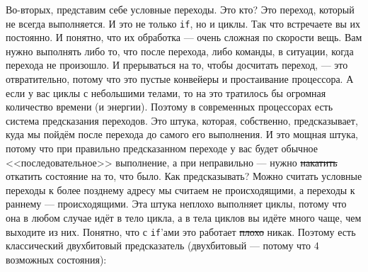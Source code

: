 \documentclass{article}
\begin{document}
    Во-вторых, представим себе условные переходы. Это кто? Это переход, который не всегда выполняется. И это не только \texttt{if}, но и циклы. Так что встречаете вы их постоянно. И понятно, что их обработка --- очень сложная по скорости вещь. Вам нужно выполнять либо то, что после перехода, либо команды, в ситуации, когда перехода не произошло. И прерываться на то, чтобы досчитать переход, --- это отвратительно, потому что это пустые конвейеры и простаивание процессора. А если у вас циклы с небольшими телами, то на это тратилось бы огромная количество времени (и энергии). Поэтому в современных процессорах есть система предсказания переходов. Это штука, которая, собственно, предсказывает, куда мы пойдём после перехода до самого его выполнения. И это мощная штука, потому что при правильно предсказанном переходе у вас будет обычное <<последовательное>> выполнение, а при неправильно --- нужно \sout{накатить} откатить состояние на то, что было. Как предсказывать? Можно считать условные переходы к более позднему адресу мы считаем не происходящими, а переходы к раннему --- происходящими. Эта штука неплохо выполняет циклы, потому что она в любом случае идёт в тело цикла, а в тела циклов вы идёте много чаще, чем выходите из них. Понятно, что с \texttt{if}'ами это работает \sout{плохо} никак. Поэтому есть классический двухбитовый предсказатель (двухбитовый --- потому что 4 возможных состояния):
    \begin{center}
    \end{center}
\end{document}
